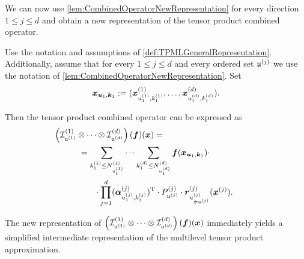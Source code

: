\documentclass[	a4paper, 
								11pt]{article}
\theoremstyle{plain}
\begin{document}
We can now use \cref{lem:CombinedOperatorNewRepresentation} for every
direction $ 1 \leq j \leq d $ and obtain a new representation of the tensor 
product combined operator.

\begin{theorem}\label{thrm:NewRepresenationTensorProductCombinedOperator}
Use the notation and assumptions of \cref{def:TPMLGeneralRepresentation}. 
Additionally, assume that for every $ 1 \leq j \leq d $ and every ordered set
$ \mathfrak{u}^{(j)} $ we use the notation of
\cref{lem:CombinedOperatorNewRepresentation}. Set 
\begin{align*}
\boldsymbol{x}_{\boldsymbol{u}_1,\boldsymbol{k}_1} := (\boldsymbol{x}_{u_1^{(1)},k_1^{(1)}}^{(1)}, \dots, \boldsymbol{x}_{u_1^
  {(d)},k_1^{(d)}}^{(d)}).
\end{align*}
 
Then the tensor product combined operator can be expressed as
 \begin{align}\label{eq:NewRepresenationTensorProductCombinedOperator}
 \begin{aligned}
 & \hspace{-3em}\left(\cI_{\fraku^{(1)}}^{(1)} \otimes \cdots \otimes 
  \cI_{\fraku^{(d)}}^{(d)} \right) (\ff)(\xx) =  \\
&= \sum_{k_1^{(1)} \leq N_{u_1^{(1)}}^{(1)}} \cdots \sum_{k_1^{(d)} \leq 
  N_{u_1^{(d)}}^{(d)}} \ff(\xx_{\uu_1,\kk_1}) \cdot  \\
&\phantom{5em} \cdot \prod_{j=1}^{d} ( \aalpha^{(j)}_{u_1^{(j)},
  k_1^{(j)}} 
  )^{\transpose} \cdot P^{(j)}_{\fraku^{(j)}} \cdot \rr^{(j)}_{u^{(j)}
  _{\# \fraku^{(j)}}} ( \xx^{(j)}). 
\end{aligned}
\end{align}
\end{theorem}

The new representation of $ \left(\mathcal{I}_{\mathfrak{u}^{(1)}}^{(1)} \otimes \cdots
\otimes \mathcal{I}_{\mathfrak{u}^{(d)}}^{(d)} \right) (\boldsymbol{f})(\boldsymbol{x}) $ immediately yields a simplified intermediate representation of the multilevel tensor product approximation.
\end{document}
